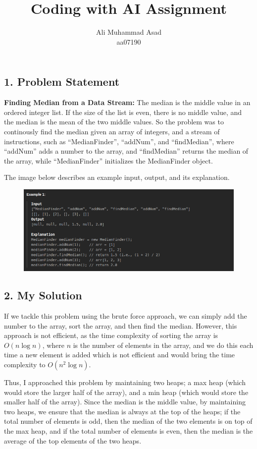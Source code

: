 \documentclass{article}
\title{Coding with AI Assignment}
\author{Ali Muhammad Asad \\ aa07190}
\date{} %
\theoremstyle{mytheoremstyle}
\theoremstyle{mytheoremstyle}
\theoremstyle{myproblemstyle}
\begin{document}
    \maketitle

\subsection*{1. Problem Statement}
\textbf{Finding Median from a Data Stream:} The median is the middle value in an ordered integer list. If the size of the list is even, there is no middle value, and the median is the mean of the two middle values. So the problem was to continously find the median given an array of integers, and a stream of instructions, such as ``MedianFinder'', ``addNum'', and ``findMedian'', where ``addNum'' adds a number to the array, and ``findMedian'' returns the median of the array, while ``MedianFinder'' initializes the MedianFinder object. 

\noindent The image below describes an example input, output, and its explanation.
\begin{figure}[H]
    \centering
    \includegraphics[width=\textwidth]{median_finder.png}
\end{figure}

\subsection*{2. My Solution}
If we tackle this problem using the brute force approach, we can simply add the number to the array, sort the array, and then find the median. However, this approach is not efficient, as the time complexity of sorting the array is $O(n\log n)$, where $n$ is the number of elements in the array, and we do this each time a new element is added which is not efficient and would bring the time complexity to $O(n^2\log n)$.

Thus, I approached this problem by maintaining two heaps; a max heap (which would store the larger half of the array), and a min heap (which would store the smaller half of the array). Since the median is the middle value, by maintaining two heaps, we ensure that the median is always at the top of the heaps; if the total number of elements is odd, then the median of the two elements is on top of the max heap, and if the total number of elements is even, then the median is the average of the top elements of the two heaps. 
\end{document}
